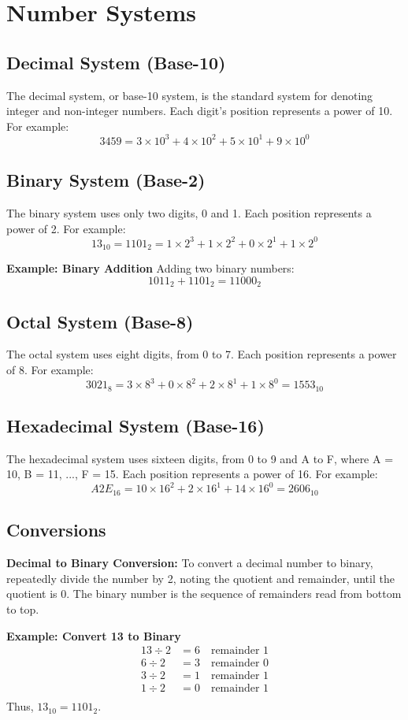 \documentclass{article}
\begin{document}
\section{Number Systems}
\subsection{Decimal System (Base-10)}
The decimal system, or base-10 system, is the standard system for denoting integer and non-integer numbers. Each digit's position represents a power of 10. For example:
\[
3459 = 3 \times 10^3 + 4 \times 10^2 + 5 \times 10^1 + 9 \times 10^0
\]

\subsection{Binary System (Base-2)}
The binary system uses only two digits, 0 and 1. Each position represents a power of 2. For example:
\[
13_{10} = 1101_2 = 1 \times 2^3 + 1 \times 2^2 + 0 \times 2^1 + 1 \times 2^0
\]

\textbf{Example: Binary Addition}
Adding two binary numbers:
\[
1011_2 + 1101_2 = 11000_2
\]

\subsection{Octal System (Base-8)}
The octal system uses eight digits, from 0 to 7. Each position represents a power of 8. For example:
\[
3021_8 = 3 \times 8^3 + 0 \times 8^2 + 2 \times 8^1 + 1 \times 8^0 = 1553_{10}
\]

\subsection{Hexadecimal System (Base-16)}
The hexadecimal system uses sixteen digits, from 0 to 9 and A to F, where A = 10, B = 11, ..., F = 15. Each position represents a power of 16. For example:
\[
A2E_{16} = 10 \times 16^2 + 2 \times 16^1 + 14 \times 16^0 = 2606_{10}
\]

\subsection{Conversions}
\textbf{Decimal to Binary Conversion:}
To convert a decimal number to binary, repeatedly divide the number by 2, noting the quotient and remainder, until the quotient is 0. The binary number is the sequence of remainders read from bottom to top.

\textbf{Example: Convert 13 to Binary}
\[
\begin{aligned}
13 \div 2 &= 6 \quad \text{remainder } 1 \\
6 \div 2 &= 3 \quad \text{remainder } 0 \\
3 \div 2 &= 1 \quad \text{remainder } 1 \\
1 \div 2 &= 0 \quad \text{remainder } 1 \\
\end{aligned}
\]
Thus, \(13_{10} = 1101_2\).
\end{document}
